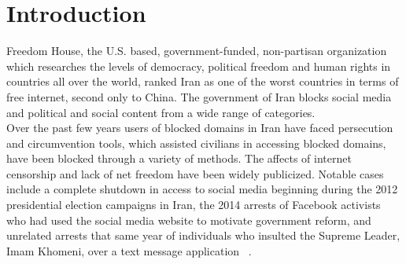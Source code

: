 \section{Introduction}\label{sec:intro}
Freedom House, the U.S. based, government-funded, non-partisan organization which researches the levels of democracy, political freedom and human rights in countries all over the world, ranked Iran as one of the worst countries in terms of free internet, second only to China. The government of Iran blocks social media and political and social content from a wide range of categories. \\
	Over the past few years users of blocked domains in Iran have faced persecution and circumvention tools, which assisted civilians in accessing blocked domains, have been blocked through a variety of methods. The affects of internet censorship and lack of net freedom have been widely publicized. Notable cases include a complete shutdown in access to social media beginning during the 2012 presidential election campaigns in Iran, the 2014 arrests of Facebook activists who had used the social media website to motivate government reform, and unrelated arrests that same year of individuals who insulted the Supreme Leader, Imam Khomeni, over a text message application ~\cite{lee}. 
